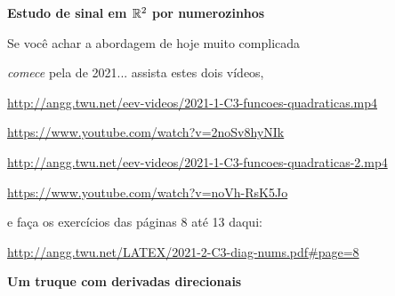 \documentclass[oneside,12pt]{article}
\begin{document}
\newpage


{\bf Estudo de sinal em $\mathbb{R}^2$ por numerozinhos}

Se você achar a abordagem de hoje muito complicada

{\sl comece} pela de 2021... assista estes dois vídeos,


\ssk

{\scriptsize

\url{http://angg.twu.net/eev-videos/2021-1-C3-funcoes-quadraticas.mp4}

\url{https://www.youtube.com/watch?v=2noSv8hyNIk}

\msk

\url{http://angg.twu.net/eev-videos/2021-1-C3-funcoes-quadraticas-2.mp4}

\url{https://www.youtube.com/watch?v=noVh-RsK5Jo}

}

\msk

e faça os exercícios das páginas 8 até 13 daqui:

\ssk

{\scriptsize

\url{http://angg.twu.net/LATEX/2021-2-C3-diag-nums.pdf#page=8}

}


\newpage


{\bf Um truque com derivadas direcionais}
\end{document}
